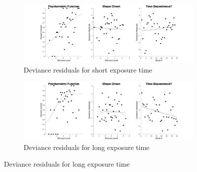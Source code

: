 \documentclass{article}
\begin{document}
\begin{figure}[!hb]
    \begin{subfigure}{\textwidth}
        \centering
        \includegraphics[width = \linewidth]{Thesis/plots/gof/segDist/segDist_mae_short_deviance.png}
        \caption{Deviance residuals for short exposure time}
    \end{subfigure}
    \begin{subfigure}{\textwidth}
        \centering
        \includegraphics[width = \linewidth]{Thesis/plots/gof/segDist/segDist_mae_long_deviance.png}
        \caption{Deviance residuals for long exposure time}
    \end{subfigure}
\end{figure}

\clearpage
\end{document}
